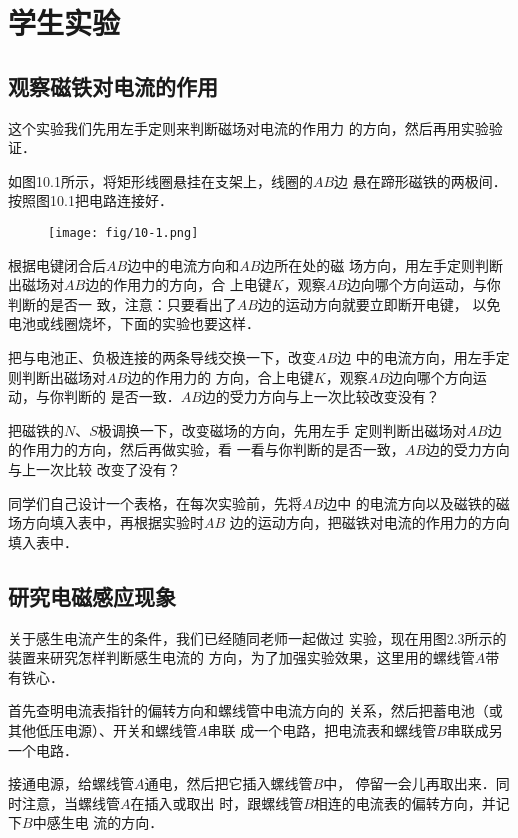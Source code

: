\chapter{学生实验}

\section{观察磁铁对电流的作用}

这个实验我们先用左手定则来判断磁场对电流的作用力
的方向，然后再用实验验证．

如图10.1所示，将矩形线圈悬挂在支架上，线圈的$AB$边
悬在蹄形磁铁的两极间．按照图10.1把电路连接好．
\begin{figure}[htp]\centering
    \texttt{[image: fig/10-1.png]}
    \caption{}
    \end{figure}

根据电键闭合后$AB$边中的电流方向和$AB$边所在处的磁
场方向，用左手定则判断出磁场对$AB$边的作用力的方向，合
上电键$K$，观察$AB$边向哪个方向运动，与你判断的是否一
致，注意：只要看出了$AB$边的运动方向就要立即断开电键，
以免电池或线圈烧坏，下面的实验也要这样．

把与电池正、负极连接的两条导线交换一下，改变$AB$边
中的电流方向，用左手定则判断出磁场对$AB$边的作用力的
方向，合上电键$K$，观察$AB$边向哪个方向运动，与你判断的
是否一致．$AB$边的受力方向与上一次比较改变没有？

把磁铁的$N$、$S$极调换一下，改变磁场的方向，先用左手
定则判断出磁场对$AB$边的作用力的方向，然后再做实验，看
一看与你判断的是否一致，$AB$边的受力方向与上一次比较
改变了没有？

同学们自己设计一个表格，在每次实验前，先将$AB$边中
的电流方向以及磁铁的磁场方向填入表中，再根据实验时$AB$
边的运动方向，把磁铁对电流的作用力的方向填入表中．

\section{研究电磁感应现象}

关于感生电流产生的条件，我们已经随同老师一起做过
实验，现在用图2.3所示的装置来研究怎样判断感生电流的
方向，为了加强实验效果，这里用的螺线管$A$带有铁心．

首先查明电流表指针的偏转方向和螺线管中电流方向的
关系，然后把蓄电池（或其他低压电源）、开关和螺线管$A$串联
成一个电路，把电流表和螺线管$B$串联成另一个电路．

接通电源，给螺线管$A$通电，然后把它插入螺线管$B$中，
停留一会儿再取出来．同时注意，当螺线管$A$在插入或取出
时，跟螺线管$B$相连的电流表的偏转方向，并记下$B$中感生电
流的方向．

